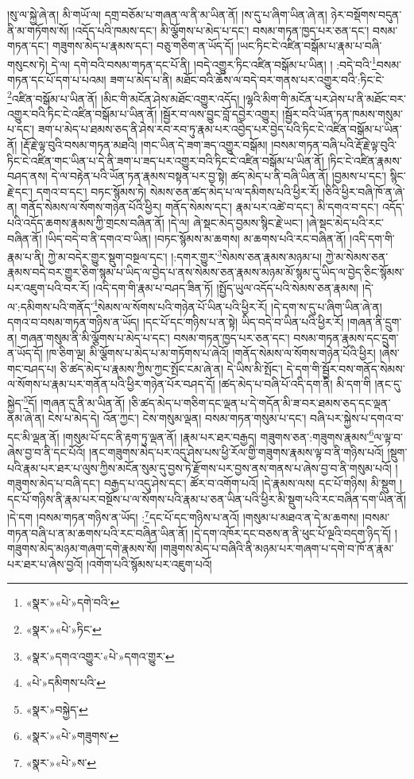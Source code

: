 །སུ་ལ་སྐྱེ་ཞེ་ན། མི་གཡོ་ལ། དགྲ་བཅོམ་པ་གཞན་ལ་ནི་མ་ཡིན་ནོ། །ས་དུ་པ་ཞིག་ཡིན་ཞེ་ན། ཉེར་བསྡོགས་བདུན་ནི་མ་གཏོགས་སོ། །འདོད་པའི་ཁམས་དང་། མི་ལྕོགས་པ་མེད་པ་དང་། བསམ་གཏན་ཁྱད་པར་ཅན་དང་། བསམ་གཏན་དང་། གཟུགས་མེད་པ་རྣམས་དང་། བཅུ་གཅིག་ན་ཡོད་དོ། །ཡང་ཏིང་ངེ་འཛིན་བསྒོམ་པ་རྣམ་པ་བཞི་གསུངས་ཏེ། དེ་ལ། དགེ་བའི་བསམ་གཏན་དང་པོ་ནི། །བདེ་འགྱུར་ཏིང་འཛིན་བསྒོམ་པ་ཡིན། །
:བདེ་བའི་\footnote{«སྣར་»«པེ་»དགེ་བའི་}བསམ་གཏན་དང་པོ་དག་པ་པའམ། ཟག་པ་མེད་པ་ནི། མཐོང་བའི་ཆོས་ལ་བདེ་བར་གནས་པར་འགྱུར་བའི་:ཏིང་ངེ་\footnote{«སྣར་»«པེ་»ཏིང་}འཛིན་བསྒོམ་པ་ཡིན་ནོ། །མིང་གི་མངོན་ཤེས་མཐོང་འགྱུར་འདོད། །ལྷའི་མིག་གི་མངོན་པར་ཤེས་པ་ནི་མཐོང་བར་འགྱུར་བའི་ཏིང་ངེ་འཛིན་བསྒོམ་པ་ཡིན་ནོ། །སྦྱོར་བ་ལས་བྱུང་བློ་དབྱེར་འགྱུར། །སྦྱོར་བའི་ཡོན་ཏན་ཁམས་གསུམ་པ་དང་། ཟག་པ་མེད་པ་ཐམས་ཅད་ནི་ཤེས་རབ་རབ་ཏུ་རྣམ་པར་འབྱེད་པར་བྱེད་པའི་ཏིང་ངེ་འཛིན་བསྒོམ་པ་ཡིན་ནོ། །རྡོ་རྗེ་ལྟ་བུའི་བསམ་གཏན་མཐའི། །གང་ཡིན་དེ་ཟག་ཟད་འགྱུར་བསྒོམ། །བསམ་གཏན་བཞི་པའི་རྡོ་རྗེ་ལྟ་བུའི་ཏིང་ངེ་འཛིན་གང་ཡིན་པ་དེ་ནི་ཟག་པ་ཟད་པར་འགྱུར་བའི་ཏིང་ངེ་འཛིན་བསྒོམ་པ་ཡིན་ནོ། །ཏིང་ངེ་འཛིན་རྣམས་བཤད་ནས། དེ་ལ་བརྟེན་པའི་ཡོན་ཏན་རྣམས་བསྟན་པར་བྱ་སྟེ། ཚད་མེད་པ་ནི་བཞི་ཡིན་ནོ། །བྱམས་པ་དང་། སྙིང་རྗེ་དང་། དགའ་བ་དང་། བཏང་སྙོམས་ཏེ། སེམས་ཅན་ཚད་མེད་པ་ལ་དམིགས་པའི་ཕྱིར་རོ། །ཅིའི་ཕྱིར་བཞི་ཁོ་ན་ཞེ་ན། གནོད་སེམས་ལ་སོགས་གཉེན་པོའི་ཕྱིར། གནོད་སེམས་དང་། རྣམ་པར་འཚེ་བ་དང་། མི་དགའ་བ་དང་། འདོད་པའི་འདོད་ཆགས་རྣམས་ཀྱི་གྲངས་བཞིན་ནོ། །དེ་ལ། ཞེ་སྡང་མེད་བྱམས་སྙིང་རྗེ་ཡང་། །ཞེ་སྡང་མེད་པའི་རང་བཞིན་ནོ། །ཡིད་བདེ་བ་ནི་དགའ་བ་ཡིན། །བཏང་སྙོམས་མ་ཆགས། མ་ཆགས་པའི་རང་བཞིན་ནོ། །འདི་དག་གི་རྣམ་པ་ནི། ཀྱེ་མ་བདེར་གྱུར་སྡུག་བསྔལ་དང་། །:དགར་གྱུར་\footnote{«སྣར་»དགའ་འགྱུར་«པེ་»དགའ་གྱུར་}སེམས་ཅན་རྣམས་མཉམ་པ། ཀྱེ་མ་སེམས་ཅན་རྣམས་བདེ་བར་གྱུར་ཅིག་སྙམ་པ་ཡིད་ལ་བྱེད་པ་ནས་སེམས་ཅན་རྣམས་མཉམ་མོ་སྙམ་དུ་ཡིད་ལ་བྱེད་ཅིང་སྙོམས་པར་འཇུག་པའི་བར་རོ། །འདི་དག་གི་རྣམ་པ་བཤད་ཟིན་ཏོ། །སྤྱོད་ཡུལ་འདོད་པའི་སེམས་ཅན་རྣམས། །དེ་ལ་:དམིགས་པའི་གནོད་\footnote{«པེ་»དམིགས་པའི་}སེམས་ལ་སོགས་པའི་གཉེན་པོ་ཡིན་པའི་ཕྱིར་རོ། །དེ་དག་ས་དུ་པ་ཞིག་ཡིན་ཞེ་ན། དགའ་བ་བསམ་གཏན་གཉིས་ན་ཡོད། །དང་པོ་དང་གཉིས་པ་ན་སྟེ། ཡིད་བདེ་བ་ཡིན་པའི་ཕྱིར་རོ། །གཞན་ནི་དྲུག་ན། གཞན་གསུམ་ནི་མི་ལྕོགས་པ་མེད་པ་དང་། བསམ་གཏན་ཁྱད་པར་ཅན་དང་། བསམ་གཏན་རྣམས་དང་དྲུག་ན་ཡོད་དོ། །ཁ་ཅིག་ལྔ། མི་ལྕོགས་པ་མེད་པ་མ་གཏོགས་པ་ཞེའོ། །གནོད་སེམས་ལ་སོགས་གཉེན་པོའི་ཕྱིར། །ཞེས་གང་བཤད་པ། ཅི་ཚད་མེད་པ་རྣམས་ཀྱིས་ཀྱང་སྤོང་ངམ་ཞེ་ན། དེ་ཡིས་མི་སྤོང་། དེ་དག་གི་སྦྱོར་བས་གནོད་སེམས་ལ་སོགས་པ་རྣམ་པར་གནོན་པའི་ཕྱིར་གཉེན་པོར་བཤད་དོ། །ཚད་མེད་པ་བཞི་པོ་འདི་དག་ནི། མི་དག་གི །ནང་དུ་སྐྱེད་\footnote{«སྣར་»བསྐྱེད་}དོ། །གཞན་དུ་ནི་མ་ཡིན་ནོ། །ཅི་ཚད་མེད་པ་གཅིག་དང་ལྡན་པ་དེ་གདོན་མི་ཟ་བར་ཐམས་ཅད་དང་ལྡན་ནམ་ཞེ་ན། ངེས་པ་མེད་དེ། འོན་ཀྱང་། ངེས་གསུམ་ལྡན། བསམ་གཏན་གསུམ་པ་དང་། བཞི་པར་སྐྱེས་པ་དགའ་བ་དང་མི་ལྡན་ནོ། །གསུམ་པོ་དང་ནི་རྟག་ཏུ་ལྡན་ནོ། །རྣམ་པར་ཐར་བརྒྱད། གཟུགས་ཅན་:གཟུགས་རྣམས་\footnote{«སྣར་»«པེ་»གཟུགས་}ལ་ལྟ་བ་ཞེས་བྱ་བ་ནི་དང་པོའོ། །ནང་གཟུགས་མེད་པར་འདུ་ཤེས་པས་ཕྱི་རོལ་གྱི་གཟུགས་རྣམས་ལྟ་བ་ནི་གཉིས་པའོ། །སྡུག་པའི་རྣམ་པར་ཐར་པ་ལུས་ཀྱིས་མངོན་སུམ་དུ་བྱས་ཏེ་རྫོགས་པར་བྱས་ནས་གནས་པ་ཞེས་བྱ་བ་ནི་གསུམ་པའོ། །གཟུགས་མེད་པ་བཞི་དང་། བརྒྱད་པ་འདུ་ཤེས་དང་། ཚོར་བ་འགོག་པའོ། །དེ་རྣམས་ལས། དང་པོ་གཉིས། མི་སྡུག །དང་པོ་གཉིས་ནི་རྣམ་པར་བསྔོས་པ་ལ་སོགས་པའི་རྣམ་པ་ཅན་ཡིན་པའི་ཕྱིར་མི་སྡུག་པའི་རང་བཞིན་དག་ཡིན་ནོ། །དེ་དག །བསམ་གཏན་གཉིས་ན་ཡོད། :\footnote{«སྣར་»«པེ་»ས་}དང་པོ་དང་གཉིས་པ་ནའོ། །གསུམ་པ་མཐའ་ན་དེ་མ་ཆགས། །བསམ་གཏན་བཞི་པ་ན་མ་ཆགས་པའི་རང་བཞིན་ཡིན་ནོ། །དེ་དག་འཁོར་དང་བཅས་ན་ནི་ཕུང་པོ་ལྔའི་བདག་ཉིད་དོ། །གཟུགས་མེད་མཉམ་གཞག་དགེ་རྣམས་སོ། །གཟུགས་མེད་པ་བཞིའི་ནི་མཉམ་པར་གཞག་པ་དགེ་བ་ཁོ་ན་རྣམ་པར་ཐར་པ་ཞེས་བྱའོ། །འགོག་པའི་སྙོམས་པར་འཇུག་པའོ། 